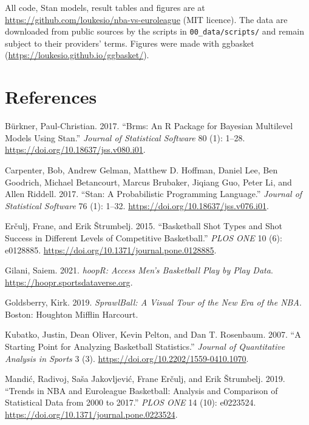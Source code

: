\documentclass[
  11pt,
  a4paper,
]{article}
\newlength{\cslhangindent}
\newenvironment{CSLReferences}[2] %
 {\begin{list}{}{%
  \setlength{\itemindent}{0pt}
  \setlength{\leftmargin}{0pt}
  \setlength{\parsep}{0pt}
  \ifodd #1
   \setlength{\leftmargin}{\cslhangindent}
   \setlength{\itemindent}{-1\cslhangindent}
  \fi
  \setlength{\itemsep}{#2\baselineskip}}}
 {\end{list}}
\begin{document}
All code, Stan models, result tables and figures are at
\url{https://github.com/loukesio/nba-vs-euroleague} (MIT licence). The
data are downloaded from public sources by the scripts in
\texttt{00\_data/scripts/} and remain subject to their providers' terms.
Figures were made with ggbasket
(\url{https://loukesio.github.io/ggbasket/}).

\section*{References}\label{references}

\label{refs}
\begin{CSLReferences}{1}{0}
Bürkner, Paul-Christian. 2017. {``Brms: An {R} Package for {Bayesian}
Multilevel Models Using {Stan}.''} \emph{Journal of Statistical
Software} 80 (1): 1--28. \url{https://doi.org/10.18637/jss.v080.i01}.

Carpenter, Bob, Andrew Gelman, Matthew D. Hoffman, Daniel Lee, Ben
Goodrich, Michael Betancourt, Marcus Brubaker, Jiqiang Guo, Peter Li,
and Allen Riddell. 2017. {``Stan: A Probabilistic Programming
Language.''} \emph{Journal of Statistical Software} 76 (1): 1--32.
\url{https://doi.org/10.18637/jss.v076.i01}.

Erčulj, Frane, and Erik Štrumbelj. 2015. {``Basketball Shot Types and
Shot Success in Different Levels of Competitive Basketball.''}
\emph{PLOS ONE} 10 (6): e0128885.
\url{https://doi.org/10.1371/journal.pone.0128885}.

Gilani, Saiem. 2021. \emph{{hoopR}: Access Men's Basketball Play by Play
Data}. \url{https://hoopr.sportsdataverse.org}.

Goldsberry, Kirk. 2019. \emph{SprawlBall: A Visual Tour of the New Era
of the {NBA}}. Boston: Houghton Mifflin Harcourt.

Kubatko, Justin, Dean Oliver, Kevin Pelton, and Dan T. Rosenbaum. 2007.
{``A Starting Point for Analyzing Basketball Statistics.''}
\emph{Journal of Quantitative Analysis in Sports} 3 (3).
\url{https://doi.org/10.2202/1559-0410.1070}.

Mandić, Radivoj, Saša Jakovljević, Frane Erčulj, and Erik Štrumbelj.
2019. {``Trends in {NBA} and {Euroleague} Basketball: Analysis and
Comparison of Statistical Data from 2000 to 2017.''} \emph{PLOS ONE} 14
(10): e0223524. \url{https://doi.org/10.1371/journal.pone.0223524}.


\end{CSLReferences}
\end{document}
